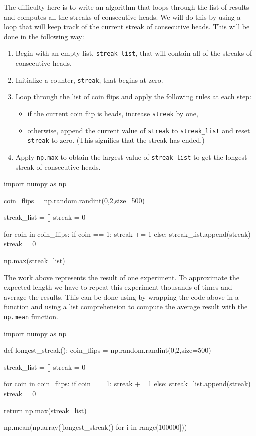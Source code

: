 \documentclass{ximera}
\begin{document}
The difficulty here is to write an algorithm that loops through the list of results and computes all the streaks of consecutive heads. We will do this by using a loop that will keep track of the current streak of consecutive heads. This will be done in the following way:
\begin{enumerate}
	\item Begin with an empty list, \verb|streak_list|, that will contain all of the streaks of consecutive heads.
	\item Initialize a counter, \verb|streak|, that begins at zero.
	\item Loop through the list of coin flips and apply the following rules at each step:
		\begin{itemize}
			\item if the current coin flip is heads, increase \verb|streak| by one,
			\item otherwise, append the current value of \verb|streak| to \verb|streak_list| and reset \verb|streak| to zero. (This signifies that the streak has ended.)
		\end{itemize}
	\item Apply \verb|np.max| to obtain the largest value of \verb|streak_list| to get the longest streak of consecutive heads.
\end{enumerate}

\begin{sageCell}
import numpy as np

coin_flips = np.random.randint(0,2,size=500)

streak_list = []
streak = 0

for coin in coin_flips:
        if coin == 1:
                streak += 1
        else:
                streak_list.append(streak)
                streak = 0

np.max(streak_list)
\end{sageCell}

The work above represents the result of one experiment. To approximate the expected length we have to repeat this experiment thousands of times and average the results. This can be done using by wrapping the code above in a function and using a list comprehension to compute the average result with the \verb|np.mean| function.

\begin{sageCell}
import numpy as np

def longest_streak():
        coin_flips = np.random.randint(0,2,size=500)

        streak_list = []
        streak = 0

        for coin in coin_flips:
                if coin == 1:
                        streak += 1
                else:
                        streak_list.append(streak)
                        streak = 0

        return np.max(streak_list)

np.mean(np.array([longest_streak() for i in range(100000]))
\end{sageCell}
\end{document}
